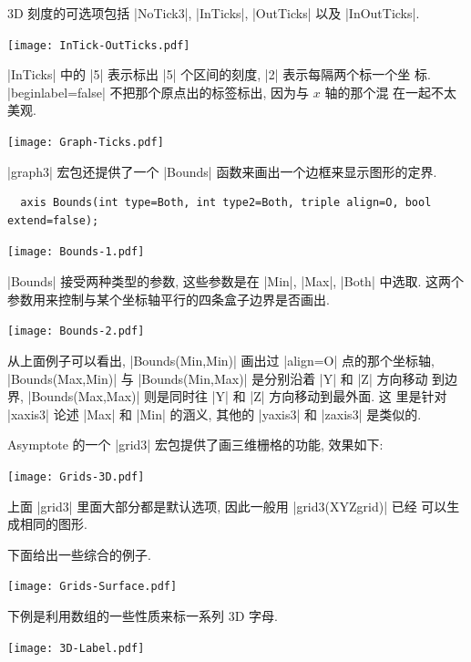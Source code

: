 \documentclass[nofonts,CJKnormalspaces]{ctexbook}
\begin{document}
3D 刻度的可选项包括 |NoTick3|, |InTicks|, |OutTicks| 以及
|InOutTicks|.
\begin{center}\texttt{[image: InTick-OutTicks.pdf]}\end{center}%

|InTicks| 中的 |5| 表示标出 |5| 个区间的刻度, |2| 表示每隔两个标一个坐
标. |beginlabel=false| 不把那个原点出的标签标出, 因为与 $x$ 轴的那个混
在一起不太美观.
\begin{center}\texttt{[image: Graph-Ticks.pdf]}\end{center}%

|graph3| 宏包还提供了一个 |Bounds| 函数来画出一个边框来显示图形的定界.
\begin{lstlisting}
  axis Bounds(int type=Both, int type2=Both, triple align=O, bool extend=false);
\end{lstlisting}
\begin{center}\texttt{[image: Bounds-1.pdf]}\end{center}%

|Bounds| 接受两种类型的参数, 这些参数是在 |Min|, |Max|, |Both| 中选取.
这两个参数用来控制与某个坐标轴平行的四条盒子边界是否画出.
\begin{center}\texttt{[image: Bounds-2.pdf]}\end{center}%

从上面例子可以看出, |Bounds(Min,Min)| 画出过 |align=O| 点的那个坐标轴,
|Bounds(Max,Min)| 与 |Bounds(Min,Max)| 是分别沿着 |Y| 和 |Z| 方向移动
到边界,  |Bounds(Max,Max)| 则是同时往 |Y| 和 |Z| 方向移动到最外面. 这
里是针对 |xaxis3| 论述 |Max| 和 |Min| 的涵义, 其他的 |yaxis3| 和
|zaxis3| 是类似的.

Asymptote 的一个 |grid3| 宏包提供了画三维栅格的功能, 效果如下:
\begin{center}\texttt{[image: Grids-3D.pdf]}\end{center}%

上面 |grid3| 里面大部分都是默认选项, 因此一般用 |grid3(XYZgrid)| 已经
可以生成相同的图形.

下面给出一些综合的例子.
\begin{center}\texttt{[image: Grids-Surface.pdf]}\end{center}%


下例是利用数组的一些性质来标一系列 3D 字母.
\begin{center}\texttt{[image: 3D-Label.pdf]}\end{center}%

\end{document}
